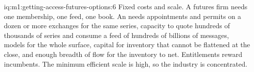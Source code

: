 \begin{solution}{iq:m1:getting-access-futures-options:6}
Fixed costs and scale. A futures firm needs one membership, one feed, one
book. An  needs appointments and permits on a dozen or
more exchanges for the same series, capacity to quote hundreds of thousands
of series and consume a feed of hundreds of billions of messages, models
for the whole surface, capital for inventory that cannot be flattened at the
close, and enough breadth of flow for the inventory to net. Entitlements
reward incumbents. The minimum efficient scale is high, so the industry is
concentrated.
\end{solution}
